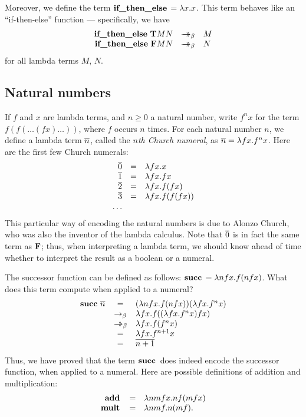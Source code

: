 \documentclass{article}
\begin{document}
Moreover, we define the term $\mathop{\textbf{\bf if\_then\_else}\,}=\lambda x.x$. This term behaves
like an ``if-then-else'' function --- specifically, we have
\[ \begin{array}{rcl}
  \ifthenelset \truet M N &\redbs& M \\
  \ifthenelset \falset M N &\redbs& N \\
\end{array}
\]
for all lambda terms $M$, $N$.

\subsection{Natural numbers}\label{ssec-natural-numbers}

If $f$ and $x$ are lambda terms, and $n\geq 0$ a natural number, write
$f^nx$ for the term $f(f(\ldots(fx)\ldots))$, where $f$ occurs $n$
times.  For each natural number $n$, we define a lambda term
$\mathop{\overline{n}}$, called the {\em $n$th Church numeral}, as $\mathop{\overline{n}}=\lambda
fx.f^nx$. Here are the first few Church numerals:
\[ \begin{array}{rcl}
  \mathop{\overline{0}} &=& \lambda fx.x \\
  \mathop{\overline{1}} &=& \lambda fx.fx \\
  \mathop{\overline{2}} &=& \lambda fx.f(fx) \\
  \mathop{\overline{3}} &=& \lambda fx.f(f(fx)) \\
  \ldots
\end{array}
\]
This particular way of encoding the natural numbers is due to Alonzo
Church, who was also the inventor of the lambda calculus.
Note that $\mathop{\overline{0}}$ is in fact the same term as ${\bf F}$; thus,
when interpreting a lambda term, we should know ahead of time whether
to interpret the result as a boolean or a numeral.

The successor function can be defined as follows: $\mathop{\textbf{\bf succ}\,} = \lambda
nfx.f(nfx)$. What does this term compute when applied to a numeral?
\[ \begin{array}{rcl}
  \mathop{\textbf{\bf succ}\,} \mathop{\overline{n}} &=& (\lambda nfx.f(nfx))(\lambda fx.f^nx) \\
  &\rightarrow_{\beta}& \lambda fx.f((\lambda fx.f^nx)fx) \\
  &\mathrel{\rightarrow\!\!\!\!\!\rightarrow}_{\beta}& \lambda fx.f(f^nx) \\
  &=& \lambda fx.f^{n+1}x \\
  &=& \mathop{\overline{n+1}}
\end{array}
\]
Thus, we have proved that the term $\mathop{\textbf{\bf succ}\,}$ does indeed encode the
successor function, when applied to a numeral. Here are possible
definitions of addition and multiplication:
\[ \begin{array}{rcl}
  \mathop{\textbf{\bf add}\,} &=& \lambda nmfx.nf(mfx) \\
  \mathop{\textbf{\bf mult}\,} &=& \lambda nmf.n(mf). 
\end{array}
\]
\end{document}
